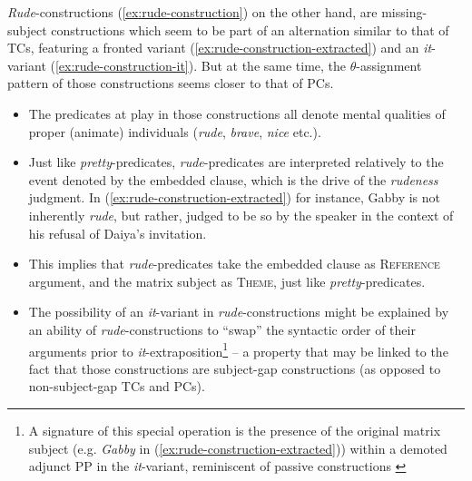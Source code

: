 \documentclass[11pt]{article}
\begin{document}
	\textit{Rude}-constructions (\ref{ex:rude-construction}) on the other hand, are missing-subject constructions which seem to be part of an alternation similar to that of TCs, featuring a fronted variant (\ref{ex:rude-construction-extracted}) and an \textit{it}-variant (\ref{ex:rude-construction-it}). But at the same time, the $\theta$-assignment pattern of those constructions seems closer to that of PCs.
	\begin{exe}
		\ex
		\begin{xlist}
			\label{ex:rude-construction-extracted}
			\label{ex:rude-construction-it}
		\end{xlist}\label{ex:rude-construction}
	\end{exe}
	\begin{itemize}
		\item The predicates at play in those constructions all denote mental qualities of proper (animate) individuals (\textit{rude}, \textit{brave}, \textit{nice} etc.).
		\item Just like \textit{pretty}-predicates, \textit{rude}-predicates are interpreted relatively to the event denoted by the embedded clause, which is the drive of the \textit{rudeness} judgment. In (\ref{ex:rude-construction-extracted}) for instance, Gabby is not inherently \textit{rude}, but rather, judged to be so by the speaker in the context of his refusal of Daiya's invitation.
		\item This implies that \textit{rude}-predicates take the embedded clause as \textsc{Reference} argument, and the matrix subject as \textsc{Theme}, just like \textit{pretty}-predicates.
		\item The possibility of an \textit{it}-variant in \textit{rude}-constructions might be explained by an ability of \textit{rude}-constructions to ``swap'' the syntactic order of their arguments prior to \textit{it}-extraposition\footnote{A signature of this special operation is the presence of the original matrix subject (e.g. \textit{Gabby} in (\ref{ex:rude-construction-extracted})) within a demoted adjunct PP in the \textit{it}-variant, reminiscent of passive constructions \cite{Bennis2004}} -- a property that may be linked to the fact that those constructions are subject-gap constructions (as opposed to non-subject-gap TCs and PCs).
		
	\end{itemize}
\end{document}
